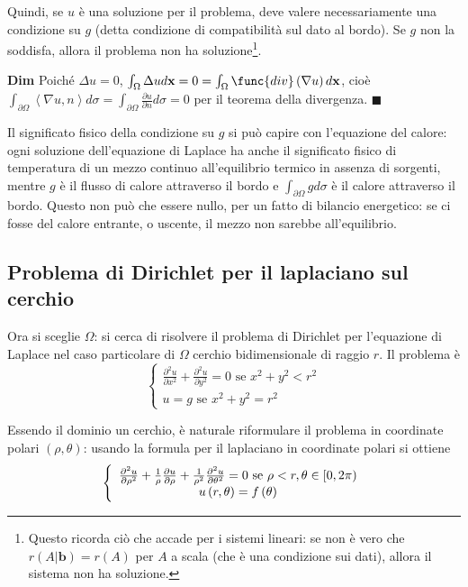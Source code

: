 \documentclass{article}
\begin{document}
Quindi, se $u$ \`{e} una soluzione per il problema, deve valere
necessariamente una condizione su $g$ (detta condizione di compatibilit\`{a}
sul dato al bordo). Se $g$ non la soddisfa, allora il problema non ha
soluzione\footnote{%
Questo ricorda ci\`{o} che accade per i sistemi lineari: se non \`{e} vero
che $r\left( A|\mathbf{b}\right) =r\left( A\right) $ per $A$ a scala (che 
\`{e} una condizione sui dati), allora il sistema non ha soluzione.}.

\textbf{Dim} Poich\'{e} $\Delta u=0$, $\int_{\Omega }\Delta ud\mathbf{x}%
=0=\int_{\Omega }\func{div}\left( \nabla u\right) d\mathbf{x}$, cio\`{e} $%
\int_{\partial \Omega }\left\langle \nabla u,n\right\rangle d\sigma
=\int_{\partial \Omega }\frac{\partial u}{\partial n}d\sigma =0$ per il
teorema della divergenza. $\blacksquare $

Il significato fisico della condizione su $g$ si pu\`{o} capire con
l'equazione del calore: ogni soluzione dell'equazione di Laplace ha anche il
significato fisico di temperatura di un mezzo continuo all'equilibrio
termico in assenza di sorgenti, mentre $g$ \`{e} il flusso di calore
attraverso il bordo e $\int_{\partial \Omega }gd\sigma $ \`{e} il calore
attraverso il bordo. Questo non pu\`{o} che essere nullo, per un fatto di
bilancio energetico: se ci fosse del calore entrante, o uscente, il mezzo
non sarebbe all'equilibrio.

\subsection{Problema di Dirichlet per il laplaciano sul cerchio}

Ora si sceglie $\Omega $: si cerca di risolvere il problema di Dirichlet per
l'equazione di Laplace nel caso particolare di $\Omega $ cerchio
bidimensionale di raggio $r$. Il problema \`{e} 
\begin{equation*}
\left\{ 
\begin{array}{c}
\frac{\partial ^{2}u}{\partial x^{2}}+\frac{\partial ^{2}u}{\partial y^{2}}=0%
\text{ se }x^{2}+y^{2}<r^{2} \\ 
u=g\text{ se }x^{2}+y^{2}=r^{2}%
\end{array}%
\right.
\end{equation*}

Essendo il dominio un cerchio, \`{e} naturale riformulare il problema in
coordinate polari $\left( \rho ,\theta \right) $: usando la formula per il
laplaciano in coordinate polari si ottiene%
\begin{equation*}
\left\{ 
\begin{array}{c}
\frac{\partial ^{2}u}{\partial \rho ^{2}}+\frac{1}{\rho }\frac{\partial u}{%
\partial \rho }+\frac{1}{\rho ^{2}}\frac{\partial ^{2}u}{\partial \theta ^{2}%
}=0\text{ se }\rho <r,\theta \in \lbrack 0,2\pi ) \\ 
u\left( r,\theta \right) =f\left( \theta \right)%
\end{array}%
\right.
\end{equation*}
\end{document}
